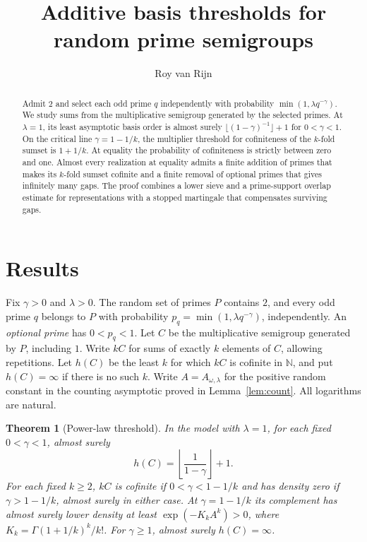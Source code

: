 \documentclass[11pt]{article}
\title{Additive basis thresholds for random prime semigroups}
\author{Roy van Rijn}
\date{}
\newtheorem{theorem}{Theorem}
\newcommand{\N}{\mathbb N}
\begin{document}
\maketitle

\begin{abstract}
Admit \(2\) and select each odd prime \(q\) independently with
probability \(\min(1,\lambda q^{-\gamma})\). We study sums from the
multiplicative semigroup generated by the selected primes. At
\(\lambda=1\), its least asymptotic basis order is almost surely
\(\lfloor(1-\gamma)^{-1}\rfloor+1\) for \(0<\gamma<1\).
On the critical line \(\gamma=1-1/k\), the multiplier threshold for
cofiniteness of the \(k\)-fold sumset is \(1+1/k\). At equality the
probability of cofiniteness is strictly between zero and one.
Almost every realization at equality admits a finite addition of
primes that makes its \(k\)-fold sumset cofinite and a finite
removal of optional primes that gives infinitely many gaps. The proof combines a
lower sieve and a prime-support overlap estimate for representations
with a stopped martingale that compensates surviving gaps.
\end{abstract}

\section{Results}

Fix \(\gamma>0\) and \(\lambda>0\). The random set of primes \(P\)
contains \(2\), and every odd prime \(q\) belongs to \(P\) with
probability \(p_q=\min(1,\lambda q^{-\gamma})\), independently.
An \emph{optional prime} has \(0<p_q<1\).
Let \(C\) be the multiplicative semigroup generated by \(P\),
including \(1\). Write \(kC\) for sums of exactly \(k\) elements
of \(C\), allowing repetitions. Let \(h(C)\) be the least \(k\)
for which \(kC\) is cofinite in \(\N\), and put \(h(C)=\infty\) if
there is no such \(k\). Write \(A=A_{\omega,\lambda}\) for the
positive random constant in the counting asymptotic proved in
Lemma~\ref{lem:count}. All logarithms are natural.

\begin{theorem}[Power-law threshold]\label{thm:power}
In the model with \(\lambda=1\), for each fixed \(0<\gamma<1\),
almost surely
\[
                 h(C)=\left\lfloor\frac{1}{1-\gamma}\right\rfloor+1 .
\]
For each fixed \(k\ge2\), \(kC\) is cofinite if \(0<\gamma<1-1/k\)
and has density zero if \(\gamma>1-1/k\), almost surely in either
case. At \(\gamma=1-1/k\) its complement has almost surely lower
density at least \(\exp(-K_k A^k)>0\), where
\(K_k=\Gamma(1+1/k)^k/k!\). For \(\gamma\ge1\), almost surely
\(h(C)=\infty\).
\end{theorem}
\end{document}
